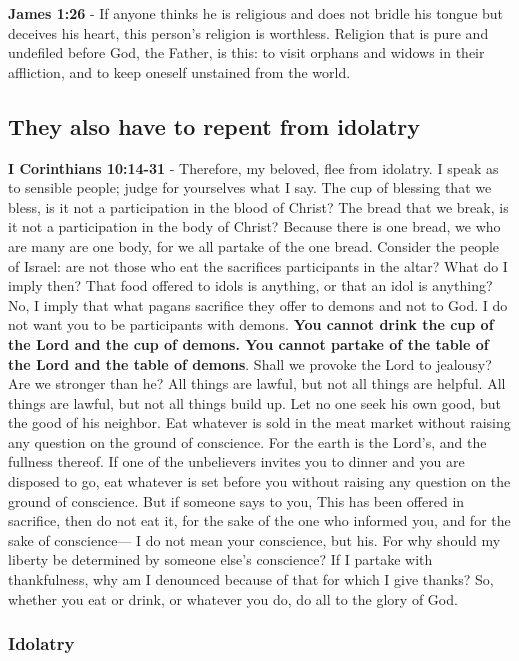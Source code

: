 \documentclass[11pt]{article}
\begin{document}
\textbf{James 1:26} - If anyone thinks he is religious and does not bridle his tongue but deceives his heart, this person's religion is worthless. Religion that is pure and undefiled before God, the Father, is this: to visit orphans and widows in their affliction, and to keep oneself unstained from the world.

\subsection{They also have to repent from idolatry}
\label{sec:orgf1fa964}
\textbf{I Corinthians 10:14-31} - Therefore, my beloved, flee from idolatry. I speak as to sensible people; judge for yourselves what I say. The cup of blessing that we bless, is it not a participation in the blood of Christ? The bread that we break, is it not a participation in the body of Christ? Because there is one bread, we who are many are one body, for we all partake of the one bread. Consider the people of Israel: are not those who eat the sacrifices participants in the altar? What do I imply then? That food offered to idols is anything, or that an idol is anything? No, I imply that what pagans sacrifice they offer to demons and not to God. I do not want you to be participants with demons. \textbf{You cannot drink the cup of the Lord and the cup of demons. You cannot partake of the table of the Lord and the table of demons}. Shall we provoke the Lord to jealousy? Are we stronger than he? All things are lawful, but not all things are helpful. All things are lawful, but not all things build up. Let no one seek his own good, but the good of his neighbor. Eat whatever is sold in the meat market without raising any question on the ground of conscience. For the earth is the Lord's, and the fullness thereof. If one of the unbelievers invites you to dinner and you are disposed to go, eat whatever is set before you without raising any question on the ground of conscience. But if someone says to you, This has been offered in sacrifice, then do not eat it, for the sake of the one who informed you, and for the sake of conscience— I do not mean your conscience, but his. For why should my liberty be determined by someone else's conscience? If I partake with thankfulness, why am I denounced because of that for which I give thanks? So, whether you eat or drink, or whatever you do, do all to the glory of God.

\subsubsection{Idolatry}
\label{sec:org32d2bc9}
\end{document}

